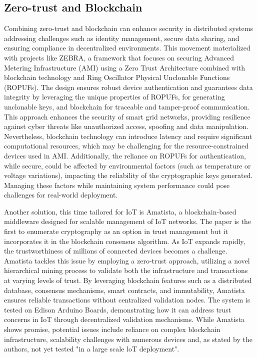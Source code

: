 \subsection{Zero-trust and Blockchain}
Combining zero-trust and blockchain can enhance security in distributed systems addressing challenges such as identity management, secure data sharing, and ensuring compliance in decentralized environments. This movement materialized with projects like ZEBRA\cite{10646352}, a framework that focuses on securing Advanced Metering Infrastructure (AMI) using a Zero Trust Architecture combined with blockchain technology and Ring Oscillator Physical Unclonable Functions (ROPUFs). The design ensures robust device authentication and guarantees data integrity by leveraging the unique properties of ROPUFs, for generating unclonable keys, and blockchain for traceable and tamper-proof communication. This approach enhances the security of smart grid networks, providing resilience against cyber threats like unauthorized access, spoofing and data manipulation. Nevertheless, blockchain technology can introduce latency and require significant computational resources, which may be challenging for the resource-constrained devices used in AMI. Additionally, the reliance on ROPUFs for authentication, while secure, could be affected by environmental factors (such as temperature or voltage variations), impacting the reliability of the cryptographic keys generated. Managing these factors while maintaining system performance could pose challenges for real-world deployment.

Another solution, this time tailored for IoT is Amatista\cite{8473444}, a blockchain-based middleware designed for scalable management of IoT networks. The paper is the first to enumerate cryptography as an option in trust management but it incorporates it in the blockchain consensus algorithm. As IoT expands rapidly, the trustworthiness of millions of connected devices becomes a challenge. Amatista tackles this issue by employing a zero-trust approach, utilizing a novel hierarchical mining process to validate both the infrastructure and transactions at varying levels of trust. By leveraging blockchain features such as a distributed database, consensus mechanisms, smart contracts, and immutability, Amatista ensures reliable transactions without centralized validation nodes. The system is tested on Edison Arduino Boards, demonstrating how it can address trust concerns in IoT through decentralized validation mechanisms. While Amatista shows promise, potential issues include reliance on complex blockchain infrastructure, scalability challenges with numerous devices and, as stated by the authors, not yet tested "in a large scale loT deployment".